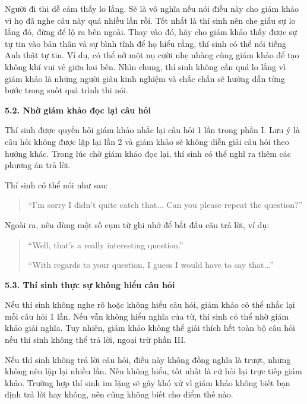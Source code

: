 \vspace{.25cm}
Người đi thi dễ cảm thấy lo lắng. Sẽ là vô nghĩa nếu nói điều này cho giám khảo vì họ đã nghe câu này quá nhiều lần rồi. 
Tốt nhất là thí sinh nên che giấu sự lo lắng đó, đừng để lộ ra bên ngoài. 
Thay vào đó, hãy cho giám khảo thấy được sự tự tin vào bản thân và sự bình tĩnh để họ hiểu rằng, thí sinh có thể nói tiếng Anh thật tự tin. 
Ví dụ, có thể nở một nụ cười nhẹ nhàng cùng giám khảo để tạo không khí vui vẻ giữa hai bên.  
Nhìn chung, thí sinh không cần quá lo lắng vì giám khảo là những người giàu kinh nghiệm và chắc chắn sẽ hướng dẫn từng bước trong suốt quá trình thi nói.  

\bigskip
\textbf{5.2. Nhờ giám khảo đọc lại câu hỏi}  

\vspace{.25cm}
Thí sinh được quyền hỏi giám khảo nhắc lại câu hỏi 1 lần trong phần I. 
Lưu ý là câu hỏi không được lặp lại lần 2 và giám khảo sẽ không diễn giải câu hỏi theo hướng khác.  
Trong lúc chờ giám khảo đọc lại, thí sinh có thể nghĩ ra thêm các phương án trả lời.  

\vspace{.25cm}
Thí sinh có thể nói như sau:  
\begin{quote}
``I'm sorry I didn’t quite catch that... Can you please repeat the question?''  
\end{quote}

Ngoài ra, nên dùng một số cụm từ ghi nhớ để bắt đầu câu trả lời, ví dụ:  
\begin{quote}
``Well, that’s a really interesting question.''  

``With regards to your question, I guess I would have to say that...''  
\end{quote}

\textbf{5.3. Thí sinh thực sự không hiểu câu hỏi}  

\vspace{.25cm}
Nếu thí sinh không nghe rõ hoặc không hiểu câu hỏi, giám khảo có thể nhắc lại mỗi câu hỏi 1 lần. 
Nếu vẫn không hiểu nghĩa của từ, thí sinh có thể nhờ giám khảo giải nghĩa.  
Tuy nhiên, giám khảo không thể giải thích hết toàn bộ câu hỏi nếu thí sinh không thể trả lời, ngoại trừ phần III.  

\vspace{.25cm}
Nếu thí sinh không trả lời câu hỏi, điều này không đồng nghĩa là trượt, nhưng không nên lặp lại nhiều lần. 
Nếu không hiểu, tốt nhất là cứ hỏi lại trực tiếp giám khảo.  
Trường hợp thí sinh im lặng sẽ gây khó xử vì giám khảo không biết bạn định trả lời hay không, nên cũng không biết cho điểm thế nào.  

